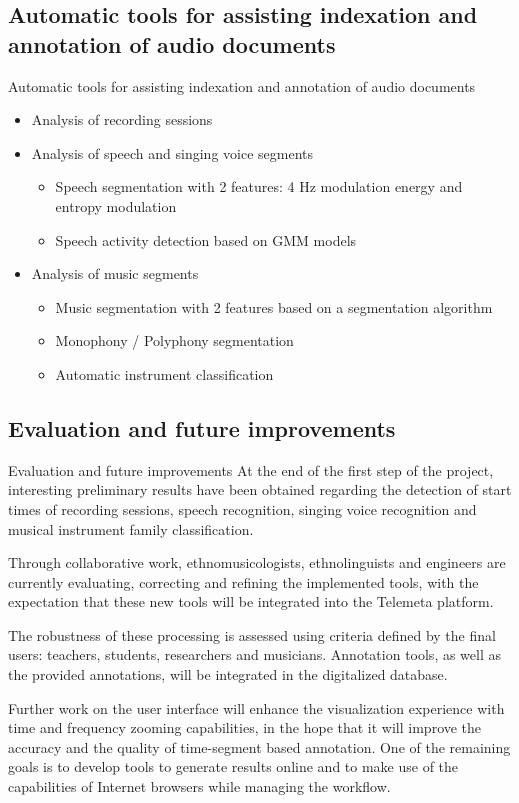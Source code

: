 \documentclass[final, hyperref, table]{beamer}
\begin{document}
\subsection{Automatic tools for assisting indexation and annotation of audio documents}
\begin{frame}{Automatic tools for assisting indexation and annotation of audio documents}
  \begin{itemize}
  \item Analysis of recording sessions
  \item Analysis of speech and singing voice segments
    \begin{itemize}
    \item Speech segmentation with 2 features: 4 Hz modulation energy and entropy modulation
    \item Speech activity detection based on GMM models
    \end{itemize}
  \item Analysis of music segments
    \begin{itemize}
    \item Music segmentation with 2 features based on a segmentation algorithm
    \item Monophony / Polyphony segmentation
    \item Automatic instrument classification

    \end{itemize}
  \end{itemize}
\end{frame}
\subsection{Evaluation and future improvements}
\begin{frame}{Evaluation and future improvements}
  At the end of the first step of the project, interesting preliminary
  results have been obtained regarding the detection of start times of
  recording sessions, speech recognition, singing voice recognition
  and musical instrument family classification.

  Through collaborative work, ethnomusicologists, ethnolinguists and
  engineers are currently evaluating, correcting and refining the
  implemented tools, with the expectation that these new tools will be
  integrated into the Telemeta platform.

  The robustness of these processing is assessed using criteria
  defined by the final users: teachers, students, researchers and
  musicians. Annotation tools, as well as the provided annotations,
  will be integrated in the digitalized database.

  Further work on the user interface will enhance the visualization
  experience with time and frequency zooming capabilities, in the hope
  that it will improve the accuracy and the quality of time-segment
  based annotation. One of the remaining goals is to develop tools to
  generate results online and to make use of the capabilities of
  Internet browsers while managing the workflow.
\end{frame}
\end{document}
